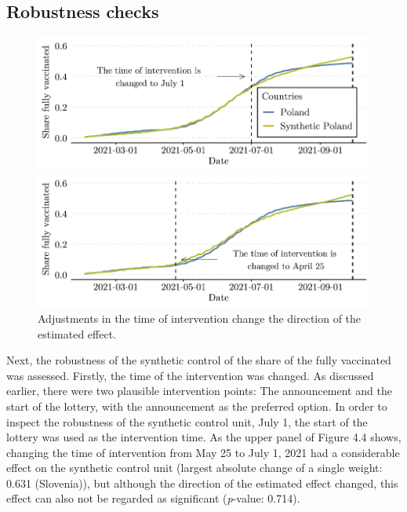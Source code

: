 \documentclass{scrbook}
\begin{document}
\subsection*{Robustness checks}

\begin{figure}[h]
\caption[Robustness check: Time of intervention]{Adjustments in the time of intervention change the direction of the estimated effect.}

\begin{center}\includegraphics{bachelor_thesis_files/figure-latex/unnamed-chunk-5-1} \end{center}



\begin{center}\includegraphics{bachelor_thesis_files/figure-latex/unnamed-chunk-5-2} \end{center}
\end{figure}

Next, the robustness of the synthetic control of the share of the fully
vaccinated was assessed. Firstly, the time of the intervention was
changed. As discussed earlier, there were two plausible intervention
points: The announcement and the start of the lottery, with the
announcement as the preferred option. In order to inspect the robustness
of the synthetic control unit, July 1, the start of the lottery was used
as the intervention time. As the upper panel of Figure 4.4 shows,
changing the time of intervention from May 25 to July 1, 2021 had a
considerable effect on the synthetic control unit (largest absolute
change of a single weight: 0.631 (Slovenia)), but although the direction
of the estimated effect changed, this effect can also not be regarded as
significant (\textit{p}-value: 0.714).
\end{document}
